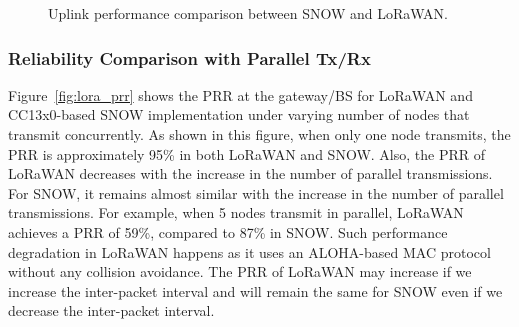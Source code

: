 \begin{figure*}[t]
    \centering
      \hfill
      \hfill 
    \caption{Uplink performance comparison between SNOW and LoRaWAN.}
    \label{fig:lora-comp}
 \end{figure*}
\subsubsection{Reliability Comparison with Parallel Tx/Rx}
Figure~\ref{fig:lora_prr} shows the PRR at the gateway/BS for LoRaWAN and CC13x0-based SNOW implementation under varying number of nodes that transmit concurrently. As shown in this figure, when only one node transmits, the PRR is approximately 95\% in both LoRaWAN and SNOW. Also, the PRR of LoRaWAN decreases with the increase in the number of parallel transmissions. For SNOW, it remains almost similar with the increase in the number of parallel transmissions. For example, when 5 nodes transmit in parallel, LoRaWAN achieves a PRR of 59\%, compared to 87\% in SNOW. Such performance degradation in LoRaWAN happens as it uses an ALOHA-based MAC protocol without any collision avoidance. The PRR of LoRaWAN may increase if we increase the inter-packet interval and will remain the same for SNOW even if we decrease the inter-packet interval. 

